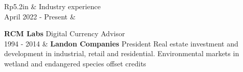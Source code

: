 \documentclass[letterpaper, 11pt]{article}
\newcommand{\headingfont}{\Large\color{OliveGreen}}
\newenvironment{SectionTable}[1]{
	\renewcommand*{\arraystretch}{1.7}
	\setlength{\tabcolsep}{10pt}
	\begin{longtable}{Rp{5.2in}} & #1 \\}
{\end{longtable}\vspace{-.3cm}}
\begin{document}

\begin{SectionTable}{\headingfont Industry experience}

April 2022 - Present &

\textbf{RCM Labs} Digital Currency Advisor\\

1994 - 2014 &
\textbf{Landon Companies} President \newline
Real estate investment and development in industrial, retail and residential. Environmental markets in wetland and endangered species offset credits \\
\end{SectionTable}

\end{document}

